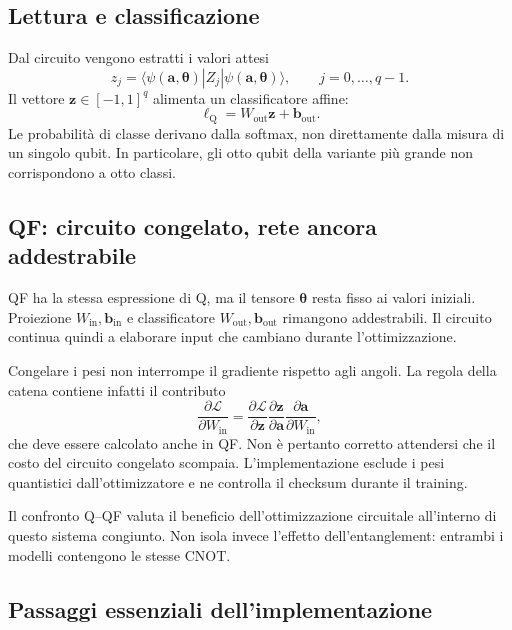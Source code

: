 \subsection{Lettura e classificazione}

Dal circuito vengono estratti i valori attesi
\begin{equation}
  z_j=
  \langle\psi(\boldsymbol a,\boldsymbol\theta)|
     Z_j|\psi(\boldsymbol a,\boldsymbol\theta)\rangle,
  \qquad j=0,\ldots,q-1.
  \label{eq:lettura-z}
\end{equation}
Il vettore \(\boldsymbol z\in[-1,1]^q\) alimenta un classificatore affine:
\[
  \boldsymbol\ell_{\mathrm Q}
    =W_{\mathrm{out}}\boldsymbol z+\boldsymbol b_{\mathrm{out}}.
\]
Le probabilità di classe derivano dalla softmax, non direttamente dalla
misura di un singolo qubit. In particolare, gli otto qubit della variante
più grande non corrispondono a otto classi.

\subsection{QF: circuito congelato, rete ancora addestrabile}
\label{sec:qf}

QF ha la stessa espressione di Q, ma il tensore
\(\boldsymbol\theta\) resta fisso ai valori iniziali. Proiezione
\(W_{\mathrm{in}},\boldsymbol b_{\mathrm{in}}\) e classificatore
\(W_{\mathrm{out}},\boldsymbol b_{\mathrm{out}}\) rimangono addestrabili.
Il circuito continua quindi a elaborare input che cambiano durante
l'ottimizzazione.

Congelare i pesi non interrompe il gradiente rispetto agli angoli.
La regola della catena contiene infatti il contributo
\[
  \frac{\partial\mathcal L}{\partial W_{\mathrm{in}}}
  =\frac{\partial\mathcal L}{\partial\boldsymbol z}
    \frac{\partial\boldsymbol z}{\partial\boldsymbol a}
    \frac{\partial\boldsymbol a}{\partial W_{\mathrm{in}}},
\]
che deve essere calcolato anche in QF. Non è pertanto corretto attendersi
che il costo del circuito congelato scompaia. L'implementazione esclude
i pesi quantistici dall'ottimizzatore e ne controlla il checksum durante
il training.

Il confronto Q--QF valuta il beneficio dell'ottimizzazione circuitale
all'interno di questo sistema congiunto. Non isola invece l'effetto
dell'entanglement: entrambi i modelli contengono le stesse CNOT.

\subsection{Passaggi essenziali dell'implementazione}
\label{sec:snippet-reti}

